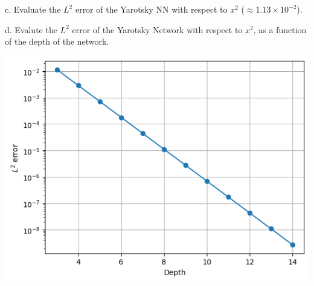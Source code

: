 \documentclass{article}
\begin{document}
    c. Evaluate the $L^2$ error of the Yarotsky NN with respect to $x^2$ ($\approx 1.13\times 10^{-2}$).

     
    d. Evalute the $L^2$ error of the Yarotsky Network with respect to $x^2$, as a function of the depth of the network.

    \begin{center}\includegraphics[scale = 0.5]{Yarotsky_convergence.png}\end{center}

  
\end{document}
